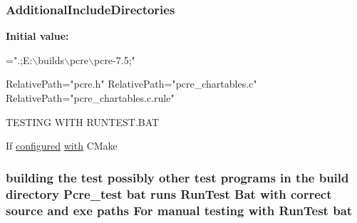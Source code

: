 \subsubsection[{\texorpdfstring{Additional\+Include\+Directories}{AdditionalIncludeDirectories}}]{\setlength{\rightskip}{0pt plus 5cm}Additional\+Include\+Directories}\hypertarget{NON-AUTOTOOLS-BUILD_8txt_a22ab1a0c47d6c9a6e0d1375ee373b389}{}\label{NON-AUTOTOOLS-BUILD_8txt_a22ab1a0c47d6c9a6e0d1375ee373b389}
{\bfseries Initial value\+:}
\begin{DoxyCode}
=\textcolor{stringliteral}{".;E:\(\backslash\)builds\(\backslash\)pcre\(\backslash\)pcre-7.5;"}

RelativePath=\textcolor{stringliteral}{"pcre.h"}
RelativePath=\textcolor{stringliteral}{"pcre\_chartables.c"}
RelativePath=\textcolor{stringliteral}{"pcre\_chartables.c.rule"}


TESTING WITH RUNTEST.BAT

If \hyperlink{pcre_8txt_a1e9c6bf3f24fe87fc94c35449ccdef84}{configured} \hyperlink{group__apr__atomic_ga62bdcea60b77e638d3d88947a34aff05}{with} CMake
\end{DoxyCode}
\subsubsection[{\texorpdfstring{bat}{bat}}]{\setlength{\rightskip}{0pt plus 5cm}building the test possibly other test programs {\bf in} the build {\bf directory} Pcre\+\_\+test bat runs Run\+Test Bat {\bf with} correct {\bf source} and {\bf exe} paths For manual testing {\bf with} Run\+Test bat}\hypertarget{NON-AUTOTOOLS-BUILD_8txt_a37503c72103bf00c07d6e7827c1579b8}{}\label{NON-AUTOTOOLS-BUILD_8txt_a37503c72103bf00c07d6e7827c1579b8}
